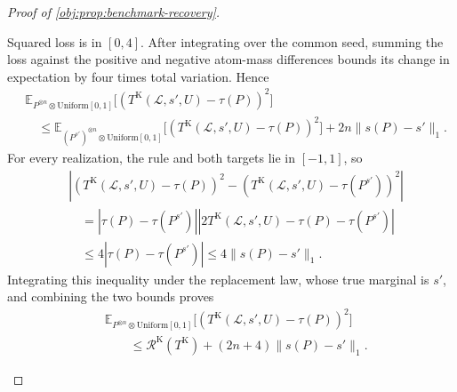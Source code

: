 \documentclass[11pt]{article}
\begin{document}
\begin{proof}[Proof of \cref{obj:prop:benchmark-recovery}]
\begin{enumerate}
Squared loss is in \([0,4]\). After integrating over the common seed, summing the loss against the positive and negative atom-mass differences bounds its change in expectation by four times total variation. Hence
\[
\begin{aligned}
&\mathbb E_{P^{\otimes n}\otimes\mathrm{Uniform}[0,1]}
\bigl[(T^{\mathrm K}(\mathcal L,s',U)-\tau(P))^2\bigr]\\
&\quad\le
\mathbb E_{(P^{s'})^{\otimes n}\otimes\mathrm{Uniform}[0,1]}
\bigl[(T^{\mathrm K}(\mathcal L,s',U)-\tau(P))^2\bigr]
+2n\|s(P)-s'\|_1.
\end{aligned}
\]
For every realization, the rule and both targets lie in \([-1,1]\), so
\[
\begin{aligned}
&\left|
(T^{\mathrm K}(\mathcal L,s',U)-\tau(P))^2
-(T^{\mathrm K}(\mathcal L,s',U)-\tau(P^{s'}))^2
\right|\\
&\quad=
|\tau(P)-\tau(P^{s'})|
\left|2T^{\mathrm K}(\mathcal L,s',U)-\tau(P)-\tau(P^{s'})\right|\\
&\quad\le4|\tau(P)-\tau(P^{s'})|
\le4\|s(P)-s'\|_1.
\end{aligned}
\]
Integrating this inequality under the replacement law, whose true marginal is \(s'\), and combining the two bounds proves
\[
\begin{aligned}
&\mathbb E_{P^{\otimes n}\otimes\mathrm{Uniform}[0,1]}
\bigl[(T^{\mathrm K}(\mathcal L,s',U)-\tau(P))^2\bigr]\\
&\qquad\le
\mathscr R^{\mathrm K}(T^{\mathrm K})
+(2n+4)\|s(P)-s'\|_1.
\end{aligned}
\]


\end{enumerate}
\end{proof}
\end{document}

